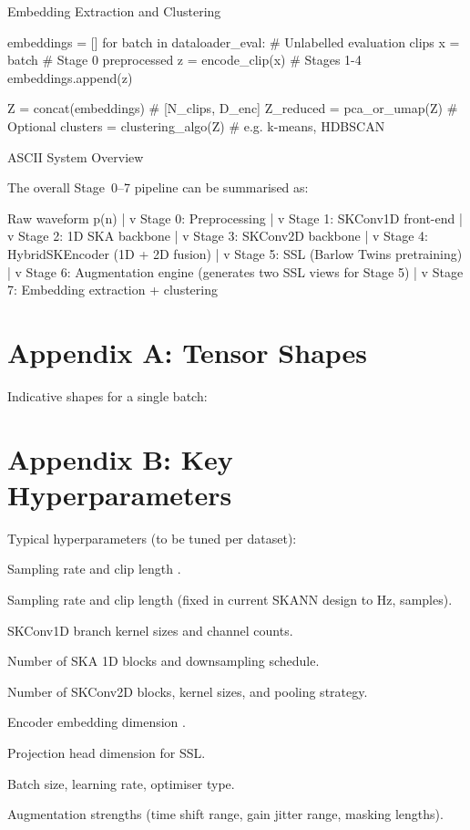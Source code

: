 \documentclass[12pt]{article}
\begin{document}
Embedding Extraction and Clustering

embeddings = []
for batch in dataloader_eval:    \# Unlabelled evaluation clips
    x = batch                    \# Stage 0 preprocessed
    z = encode_clip(x)           \# Stages 1-4
    embeddings.append(z)

Z = concat(embeddings)           \# [N_clips, D_enc]
Z_reduced = pca_or_umap(Z)       \# Optional
clusters = clustering_algo(Z)    \# e.g. k-means, HDBSCAN

ASCII System Overview

The overall Stage 0–7 pipeline can be summarised as:

Raw waveform p(n)
            |
            v
   Stage 0: Preprocessing
            |
            v
   Stage 1: SKConv1D front-end
            |
            v
   Stage 2: 1D SKA backbone
            |
            v
   Stage 3: SKConv2D backbone
            |
            v
   Stage 4: HybridSKEncoder (1D + 2D fusion)
            |
            v
   Stage 5: SSL (Barlow Twins pretraining)
            |
            v
   Stage 6: Augmentation engine 
            (generates two SSL views for Stage 5)
            |
            v
   Stage 7: Embedding extraction + clustering

\section*{Appendix A: Tensor Shapes}
Indicative shapes for a single batch:

\section*{Appendix B: Key Hyperparameters}
Typical hyperparameters (to be tuned per dataset):

Sampling rate  and clip length .

Sampling rate and clip length (fixed in current SKANN design to  Hz,  samples).

SKConv1D branch kernel sizes and channel counts.

Number of SKA 1D blocks and downsampling schedule.

Number of SKConv2D blocks, kernel sizes, and pooling strategy.

Encoder embedding dimension .

Projection head dimension  for SSL.

Batch size, learning rate, optimiser type.

Augmentation strengths (time shift range, gain jitter range, masking lengths).
\end{document}
